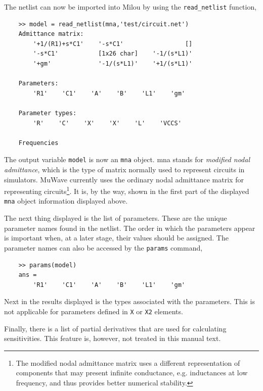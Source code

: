 The netlist can now be imported into Milou by using the
\verb"read_netlist" function,
\begin{small}
\begin{verbatim}
    >> model = read_netlist(mna,'test/circuit.net')
    Admittance matrix:
        '+1/(R1)+s*C1'    '-s*C1'                 []
        '-s*C1'           [1x26 char]    '-1/(s*L1)'
        '+gm'             '-1/(s*L1)'    '+1/(s*L1)'

    Parameters:
        'R1'    'C1'    'A'    'B'    'L1'    'gm'

    Parameter types:
        'R'    'C'    'X'    'X'    'L'    'VCCS'

    Frequencies
\end{verbatim}
\end{small}

The output variable \verb"model" is now an \verb"mna" object. mna
stands for \emph{modified nodal admittance}, which is the type of
matrix normally used to represent circuits in simulators. MuWave
currently uses the ordinary nodal admittance matrix for
representing circuits\footnote{The modified nodal admittance
matrix uses a different representation of components that may
present infinite conductance, e.g. inductances at low frequency,
and thus provides better numerical stability.}. It is, by the way,
shown in the first part of the displayed \verb"mna" object
information displayed above.

The next thing displayed is the list of parameters. These are the
unique parameter names found in the netlist. The order in which
the parameters appear is important when, at a later stage, their
values should be assigned. The parameter names can also be
accessed by the \verb"params" command,
\begin{small}
\begin{verbatim}
    >> params(model)
    ans =
        'R1'    'C1'    'A'    'B'    'L1'    'gm'
\end{verbatim}
\end{small}

Next in the results displayed is the types associated with the parameters.
This is not applicable for parameters defined in \verb"X" or
\verb"X2" elements.

Finally, there is a list of partial derivatives that are used for
calculating sensitivities. This feature is, however, not treated
in this manual text.

